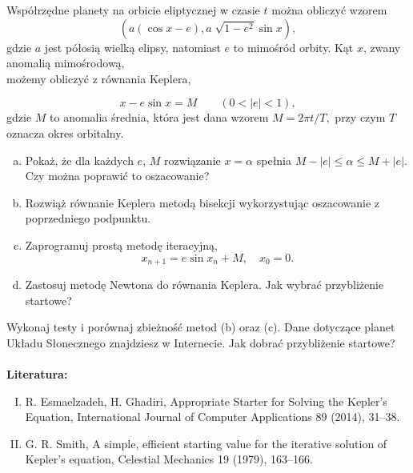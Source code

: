 \documentclass[11pt, wide]{mwart}
\begin{document}
Współrzędne planety na orbicie eliptycznej w czasie $t$ można obliczyć wzorem
\begin{equation*}
(a(\cos x - e), a \sqrt[]{1-e^2}\sin x),
\end{equation*}
gdzie $a$ jest półosią wielką elipsy, natomiast $e$ to mimośród orbity. Kąt $x$, zwany anomalią mimośrodową, \\
możemy obliczyć z równania Keplera,

\begin{equation*}
x - e \sin x = M \qquad (0 < |e| < 1),
\end{equation*}
gdzie $M$ to anomalia średnia, która jest dana wzorem $ M = 2 \pi t/T,$ przy czym $T$ oznacza okres orbitalny. \\

\begin{enumerate}[a)]
\item Pokaż, że dla każdych $e$, $M$ rozwiązanie $x = \alpha$ spełnia 
$M - |e| \leq \alpha \leq M + |e|$. Czy można poprawić to oszacowanie?
\item Rozwiąż równanie Keplera metodą bisekcji wykorzystując oszacowanie z poprzedniego podpunktu.
\item  Zaprogramuj prostą metodę iteracyjną,
\begin{equation*}
x_{n+1} = e \sin x_n + M, \quad x_0 = 0.
\end{equation*}
\item Zastosuj metodę Newtona do równania Keplera. Jak wybrać przybliżenie startowe?

\end{enumerate}
Wykonaj testy i porównaj zbieżność metod (b) oraz (c). Dane dotyczące planet Układu Słonecznego znajdziesz w Internecie. Jak dobrać przybliżenie startowe?
\\
\\
\textbf{Literatura:}
\begin{enumerate}[I.]
\item R. Esmaelzadeh, H. Ghadiri, Appropriate Starter for Solving the Kepler’s Equation, International Journal
of Computer Applications 89 (2014), 31–38.
\item G. R. Smith, A simple, efficient starting value for the iterative solution of Kepler’s equation, Celestial
Mechanics 19 (1979), 163–166.

\end{enumerate}
\end{document}
